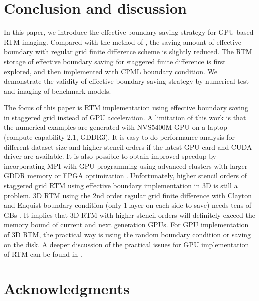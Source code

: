 

\section{Conclusion and discussion}

In this paper, we introduce the effective boundary saving strategy for GPU-based RTM imaging. Compared with the method of \cite{dussaud2008computational}, the saving amount of effective boundary with regular grid finite difference scheme is slightly reduced. The RTM storage of effective boundary saving for staggered finite difference is first explored, and then implemented with CPML boundary condition. We demonstrate the validity of effective boundary saving strategy by numerical test and imaging of benchmark models.

The focus of this paper is RTM implementation using effective boundary saving in staggered grid instead of GPU acceleration.
A limitation of this work is that the numerical examples are generated with NVS5400M GPU on a laptop (compute capability 2.1, GDDR3). It is easy to do performance analysis for different dataset size and higher stencil orders if the latest GPU card and CUDA driver are available. It is also possible to obtain improved speedup by incorporating MPI with GPU programming using advanced clusters with larger GDDR memory \citep{komatitsch2010high,suh2010cluster} or FPGA optimization \citep{fu2011eliminating,medeiros2011fpga}.  Unfortunately, higher stencil orders of staggered grid RTM using effective boundary implementation in 3D is still a problem. 3D RTM using the 2nd order regular grid finite difference with Clayton and Enquist boundary condition (only 1 layer on each side to save) needs tens of GBs \citep{liu2013wavefield}. It implies that 3D RTM with higher stencil orders will definitely exceed the memory bound of current and next generation GPUs. For GPU implementation of 3D RTM, the practical way is using the random boundary condition \citep{liu20133d} or saving on the disk. A deeper discussion of the practical issues for GPU implementation of RTM can be found in \cite{liu2012issues}.


\section*{Acknowledgments}

